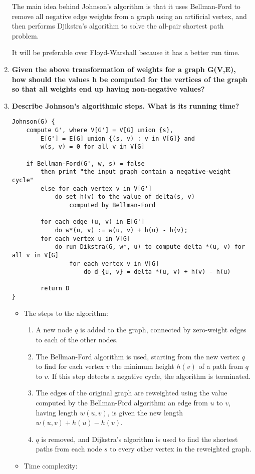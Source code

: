 \documentclass[a4paper,11pt]{article}
\begin{document}
\begin{enumerate}
  The main idea behind Johnson's algorithm is that it uses Bellman-Ford
  to remove all negative edge weights from a graph using an artificial
  vertex, and then performs Djikstra's algorithm to solve the all-pair
  shortest path problem.

  It will be preferable over Floyd-Warshall because it has a better run
  time.
\item
  \textbf{Given the above transformation of weights for a graph G(V,E),
  how should the values h be computed for the vertices of the graph so
  that all weights end up having non-negative values?}
\item
  \textbf{Describe Johnson's algorithmic steps. What is its running
  time?}

\begin{verbatim}
Johnson(G) {
    compute G', where V[G'] = V[G] union {s},
        E[G'] = E[G] union {(s, v) : v in V[G]} and
        w(s, v) = 0 for all v in V[G]

    if Bellman-Ford(G', w, s) = false
        then print "the input graph contain a negative-weight cycle"
        else for each vertex v in V[G']
            do set h(v) to the value of delta(s, v)
                computed by Bellman-Ford

        for each edge (u, v) in E[G']
            do w*(u, v) := w(u, v) + h(u) - h(v);
        for each vertex u in V[G]
            do run Dikstra(G, w*, u) to compute delta *(u, v) for all v in V[G]
                for each vertex v in V[G]
                    do d_{u, v} = delta *(u, v) + h(v) - h(u)

        return D
}
\end{verbatim}

  \begin{itemize}
  \itemsep1pt\parskip0pt
  \item
    The steps to the algorithm:

    \begin{enumerate}
    \def\labelenumii{\arabic{enumii}.}
    \itemsep1pt\parskip0pt
    \item
      A new node $q$ is added to the graph, connected by zero-weight
      edges to each of the other nodes.
    \item
      The Bellman-Ford algorithm is used, starting from the new vertex
      $q$ to find for each vertex $v$ the minimum height $h(v)$ of a
      path from $q$ to $v$. If this step detects a negative cycle, the
      algorithm is terminated.
    \item
      The edges of the original graph are reweighted using the value
      computed by the Bellman-Ford algorithm: an edge from $u$ to $v$,
      having length $w(u, v)$, is given the new length
      $w(u, v) + h(u) - h(v)$.
    \item
      $q$ is removed, and Dijkstra's algorithm is used to find the
      shortest paths from each node $s$ to every other vertex in the
      reweighted graph.
    \end{enumerate}
  \item
    Time complexity:


\end{itemize}
\end{enumerate}
\end{document}
